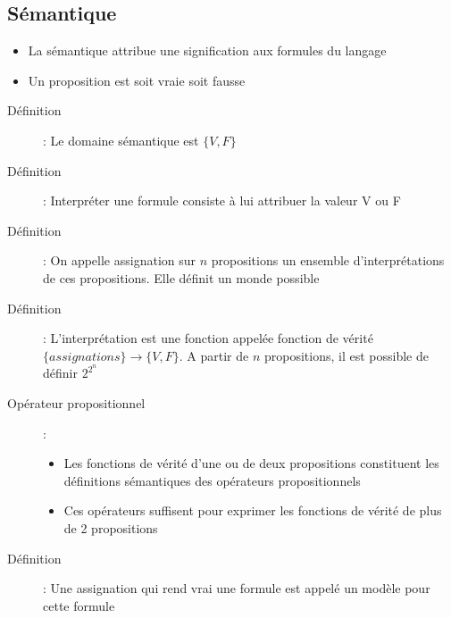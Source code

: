 \documentclass[10pt,a4paper]{article}
\begin{document}
	\subsection{Sémantique}
		\begin{itemize}
			\item La sémantique attribue une signification aux formules du langage
			\item Un proposition est soit vraie soit fausse
		\end{itemize}
		\begin{description}
			\item[Définition]: Le domaine sémantique est $\{V, F\}$
			\item[Définition]: Interpréter une formule consiste à lui attribuer la valeur V ou F
			\item[Définition]: On appelle assignation sur $n$ propositions un ensemble d'interprétations de ces propositions. Elle définit un monde possible
			\item[Définition]: L'interprétation est une fonction appelée fonction de vérité $\{assignations\}\longrightarrow\{V,F\}$. A partir de $n$ propositions, il est possible de définir $2^{2^n}$
			\item[Opérateur propositionnel]:
			\begin{itemize}
				\item Les fonctions de vérité d'une ou de deux propositions constituent les définitions sémantiques des opérateurs propositionnels
				\item Ces opérateurs suffisent pour exprimer les fonctions de vérité de plus de 2 propositions
			\end{itemize}
			\item[Définition]: Une assignation qui rend vrai une formule est appelé un modèle pour cette formule
		\end{description}
\end{document}
